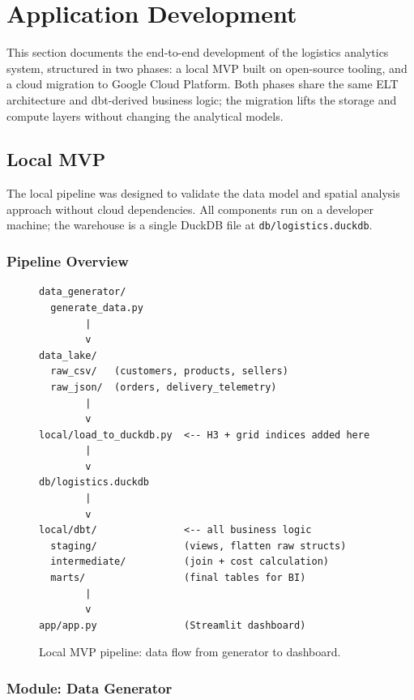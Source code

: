 \section{Application Development}
\label{sec:application_development}

This section documents the end-to-end development of the logistics analytics system,
structured in two phases: a local MVP built on open-source tooling, and a cloud migration
to Google Cloud Platform. Both phases share the same ELT architecture and dbt-derived business
logic; the migration lifts the storage and compute layers without changing the analytical models.

\subsection{Local MVP}
\label{sec:local_mvp}

The local pipeline was designed to validate the data model and spatial analysis approach
without cloud dependencies. All components run on a developer machine; the warehouse is a
single DuckDB file at \texttt{db/logistics.duckdb}.

\subsubsection{Pipeline Overview}

\begin{figure}[H]
\centering
\begin{verbatim}
data_generator/
  generate_data.py
        |
        v
data_lake/
  raw_csv/   (customers, products, sellers)
  raw_json/  (orders, delivery_telemetry)
        |
        v
local/load_to_duckdb.py  <-- H3 + grid indices added here
        |
        v
db/logistics.duckdb
        |
        v
local/dbt/               <-- all business logic
  staging/               (views, flatten raw structs)
  intermediate/          (join + cost calculation)
  marts/                 (final tables for BI)
        |
        v
app/app.py               (Streamlit dashboard)
\end{verbatim}
\caption{Local MVP pipeline: data flow from generator to dashboard.}
\label{fig:local_pipeline}
\end{figure}

\subsubsection{Module: Data Generator}
\label{sec:data_generator}

